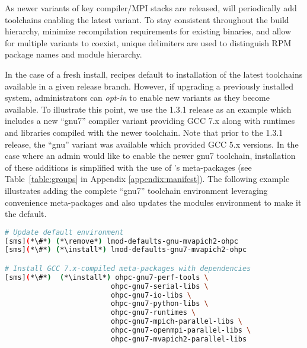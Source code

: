 As newer variants of key compiler/MPI stacks are released, \OHPC{} will
periodically add toolchains enabling the latest variant. To stay consistent
throughout the build hierarchy, minimize recompilation requirements for existing
binaries, and allow for multiple variants to coexist, unique delimiters are
used to distinguish RPM package names and module hierarchy.

In the case of a fresh install, \OHPC{} recipes default to installation of the
latest toolchains available in a given release branch. However, if upgrading a
previously installed system, administrators can {\em opt-in} to enable new
variants as they become available. To illustrate this point, we use the \OHPC{}
1.3.1 release as an example which includes a new {``gnu7''} compiler variant
providing GCC 7.x along with runtimes and libraries compiled
with the newer toolchain. Note that prior to the 1.3.1 release, the {``gnu''} variant was
available which provided GCC 5.x versions.
In the case where an admin would like to enable the newer {gnu7} toolchain,
installation of these additions is simplified
with the use of \OHPC{}'s meta-packages (see Table~\ref{table:groups} in Appendix 
\ref{appendix:manifest}).
The following example illustrates adding the complete ``gnu7'' toolchain
environment leveraging convenience meta-packages and also updates the modules environment to make it the default.

\begin{lstlisting}[language=bash,keywords={}]
# Update default environment
[sms](*\#*) (*\remove*) lmod-defaults-gnu-mvapich2-ohpc
[sms](*\#*) (*\install*) lmod-defaults-gnu7-mvapich2-ohpc

# Install GCC 7.x-compiled meta-packages with dependencies
[sms](*\#*)  (*\install*) ohpc-gnu7-perf-tools \
                         ohpc-gnu7-serial-libs \
                         ohpc-gnu7-io-libs \
                         ohpc-gnu7-python-libs \
                         ohpc-gnu7-runtimes \
                         ohpc-gnu7-mpich-parallel-libs \
                         ohpc-gnu7-openmpi-parallel-libs \
                         ohpc-gnu7-mvapich2-parallel-libs
\end{lstlisting}

